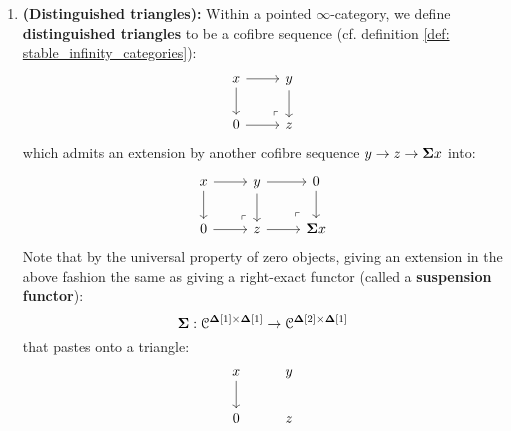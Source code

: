 \begin{definition}
            \begin{enumerate}
                \item \textbf{(Distinguished triangles):} Within a pointed $\infty$-category, we define \textbf{distinguished triangles} to be a cofibre sequence (cf. definition \ref{def: stable_infinity_categories}):
                    $$
                        \begin{tikzcd}
                            x & y \\
                            0 & z
                            \arrow[from=1-1, to=2-1]
                            \arrow[from=1-1, to=1-2]
                            \arrow[from=1-2, to=2-2]
                            \arrow[from=2-1, to=2-2]
                            \arrow["\lrcorner"{anchor=center, pos=0.125, rotate=180}, draw=none, from=2-2, to=1-1]
                        \end{tikzcd}
                    $$
                which admits an extension by another cofibre sequence $y \to z \to \suspension x$ into:
                    $$
                        \begin{tikzcd}
                            x & y & 0 \\
                            0 & z & {\suspension x}
                            \arrow[from=1-1, to=2-1]
                            \arrow[from=1-1, to=1-2]
                            \arrow[from=1-2, to=2-2]
                            \arrow[from=2-1, to=2-2]
                            \arrow["\lrcorner"{anchor=center, pos=0.125, rotate=180}, draw=none, from=2-2, to=1-1]
                            \arrow[from=2-2, to=2-3]
                            \arrow[from=1-2, to=1-3]
                            \arrow[from=1-3, to=2-3]
                            \arrow["\lrcorner"{anchor=center, pos=0.125, rotate=180}, draw=none, from=2-3, to=1-2]
                        \end{tikzcd}
                    $$
                Note that by the universal property of zero objects, giving an extension in the above fashion the same as giving a right-exact functor (called a \textbf{suspension functor}):
                    $$\suspension: \C^{\simp[1] \x \simp[1]} \to \C^{\simp[2] \x \simp[1]}$$
                that pastes onto a triangle:
                    $$
                        \begin{tikzcd}
                            x & y \\
                            0 & z
                            \arrow[from=1-1, to=2-1]

\end{tikzcd}$$
\end{enumerate}
\end{definition}
